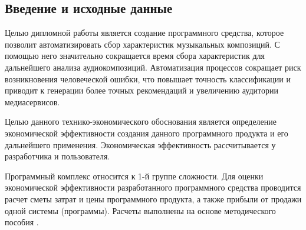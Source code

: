\subsection{Введение и исходные данные}
\label{sec:economics:introduction}

Целью дипломной работы является создание программного средства, которое позволит автоматизировать сбор характеристик музыкальных композиций. С помощью него значительно сокращается время сбора характеристик для дальнейшего анализа аудиокомпозиций. Автоматизация процессов сокращает риск возникновения человеческой ошибки, что повышает точность классификации и приводит к генерации более точных рекомендаций и увеличению аудитории медиасервисов.

Целью данного технико-экономического обоснования является определение экономической эффективности создания данного программного продукта и его дальнейшего применения. Экономическая эффективность рассчитывается у разработчика и пользователя.

Программный комплекс относится к 1-й группе сложности. Для оценки экономической эффективности разработанного программного средства проводится расчет сметы затрат и цены программного продукта, а также прибыли от продажи одной системы (программы). Расчеты выполнены на основе методического пособия \cite{palitsyn}.
